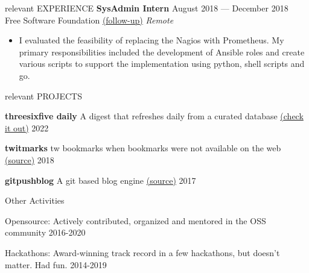 \documentclass{resume} %
\begin{document}
\begin{rSection}{relevant EXPERIENCE}
  \textbf{SysAdmin Intern} \hfill August 2018 — December 2018\\
  Free Software Foundation \href{https://www.fsf.org/blogs/sysadmin/what-i-learned-during-my-internship-with-the-fsf-tech-team}{(follow-up)} \hfill \textit{Remote}
  \begin{itemize}
    \itemsep -3pt {}
    \item I evaluated the feasibility of replacing the Nagios with Prometheus. My primary responsibilities included the development of Ansible roles and create various scripts to support the implementation using python, shell scripts and go.
  \end{itemize}


\end{rSection}


\begin{rSection}{relevant PROJECTS}
  \vspace{-1.25em}
  \item \textbf{threesixfive daily} {A digest that refreshes daily from a curated database \href{https://daily.threesixfive.shop/}{(check it out)}
  } \hfill 2022
  \item \textbf{twitmarks} {tw bookmarks when bookmarks were not available on the web \href{https://github.com/geekodour/twitmarks}{(source)}
  } \hfill 2018
  \item \textbf{gitpushblog} {A git based blog engine \href{https://github.com/geekodour/gitpushblog}{(source)}} \hfill 2017
\end{rSection}

\begin{rSection}{Other Activities}
  \vspace{-1.25em}
    \item Opensource: Actively contributed, organized and mentored in the OSS community \hfill 2016-2020
    \item Hackathons: Award-winning track record in a few hackathons, but doesn't matter. Had fun. \hfill 2014-2019
\end{rSection}




\end{document}
